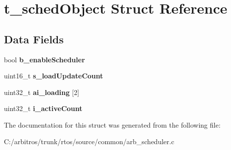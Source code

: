 \hypertarget{structt__sched_object}{\section{t\-\_\-sched\-Object Struct Reference}
\label{structt__sched_object}
}
\subsection*{Data Fields}
\begin{DoxyCompactItemize}
\item 
\hypertarget{structt__sched_object_a32bf4fb8b36d82cdfffeed16c437cd85}{bool {\bfseries b\-\_\-enable\-Scheduler}}\label{structt__sched_object_a32bf4fb8b36d82cdfffeed16c437cd85}

\item 
\hypertarget{structt__sched_object_a896b362bbf31467bb82f2dd16bcfa265}{uint16\-\_\-t {\bfseries s\-\_\-load\-Update\-Count}}\label{structt__sched_object_a896b362bbf31467bb82f2dd16bcfa265}

\item 
\hypertarget{structt__sched_object_a25d4e01511b7b68465c37e9834fb0f83}{uint32\-\_\-t {\bfseries ai\-\_\-loading} \mbox{[}2\mbox{]}}\label{structt__sched_object_a25d4e01511b7b68465c37e9834fb0f83}

\item 
\hypertarget{structt__sched_object_a2988272d29acbe305dde7c3fd8b36ef3}{uint32\-\_\-t {\bfseries i\-\_\-active\-Count}}\label{structt__sched_object_a2988272d29acbe305dde7c3fd8b36ef3}

\end{DoxyCompactItemize}


The documentation for this struct was generated from the following file\-:\begin{DoxyCompactItemize}
\item 
C\-:/arbitros/trunk/rtos/source/common/arb\-\_\-scheduler.\-c\end{DoxyCompactItemize}

